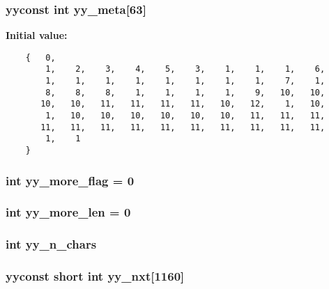 \subsubsection{\setlength{\rightskip}{0pt plus 5cm}yyconst int yy\_\-meta[63]\hspace{0.3cm}{\tt  [static]}}\label{lexer_8c_a98}


{\bf Initial value:}

\footnotesize\begin{verbatim}
    {   0,
        1,    2,    3,    4,    5,    3,    1,    1,    1,    6,
        1,    1,    1,    1,    1,    1,    1,    1,    7,    1,
        8,    8,    8,    1,    1,    1,    1,    9,   10,   10,
       10,   10,   11,   11,   11,   11,   10,   12,    1,   10,
        1,   10,   10,   10,   10,   10,   10,   11,   11,   11,
       11,   11,   11,   11,   11,   11,   11,   11,   11,   11,
        1,    1
    }\end{verbatim}\normalsize 
{}
\subsubsection{\setlength{\rightskip}{0pt plus 5cm}int yy\_\-more\_\-flag = 0\hspace{0.3cm}{\tt  [static]}}\label{lexer_8c_a105}


\subsubsection{\setlength{\rightskip}{0pt plus 5cm}int yy\_\-more\_\-len = 0\hspace{0.3cm}{\tt  [static]}}\label{lexer_8c_a106}


\subsubsection{\setlength{\rightskip}{0pt plus 5cm}int yy\_\-n\_\-chars\hspace{0.3cm}{\tt  [static]}}\label{lexer_8c_a88}


\subsubsection{\setlength{\rightskip}{0pt plus 5cm}yyconst short int yy\_\-nxt[1160]\hspace{0.3cm}{\tt  [static]}}\label{lexer_8c_a101}


